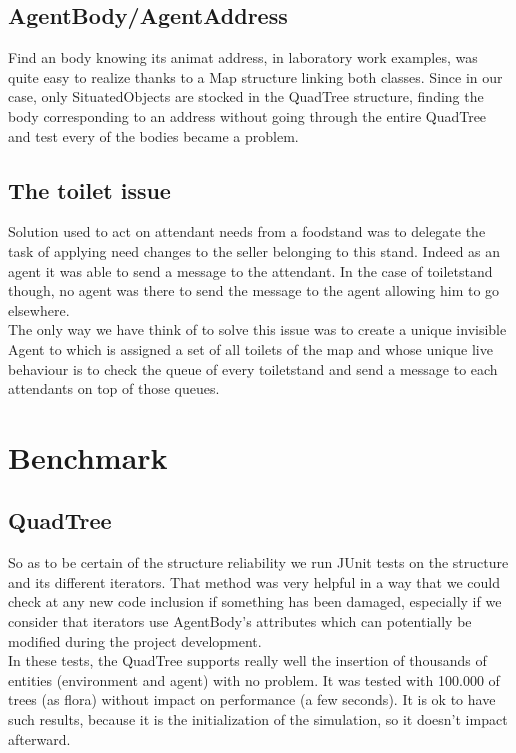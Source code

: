 \subsection{AgentBody/AgentAddress}

Find an body knowing its animat address, in laboratory work examples, was quite
easy to realize thanks to a Map structure linking both classes. Since in our
case, only SituatedObjects are stocked in the QuadTree structure, finding the
body corresponding to an address without going through the entire QuadTree and
test every of the bodies became a problem.

\subsection{The toilet issue}

Solution used to act on attendant needs from a foodstand was to delegate the task of applying need changes to the seller belonging to this stand. Indeed as an agent it was able to send a message to the attendant. In the case of toiletstand though, no agent was there to send the message to the agent allowing him to go elsewhere.\\

The only way we have think of to solve this issue was to create a unique invisible Agent to which is assigned a set of all toilets of the map and whose unique live behaviour is to check the queue of every toiletstand and send a message to each attendants on top of those queues.

\section{Benchmark}

\subsection{QuadTree}

So as to be certain of the structure reliability we run JUnit tests on the structure and its different iterators. That method was very helpful in a way that we could check at any new code inclusion if something has been damaged, especially if we consider that iterators use AgentBody’s attributes which can potentially be modified during the project development.\\

In these tests, the QuadTree supports really well the insertion of thousands of entities (environment and agent) with no problem. It was tested with 100.000 of trees (as flora) without impact on performance (a few seconds). It is ok to have such results, because it is the initialization of the simulation, so it doesn’t impact afterward.\\

